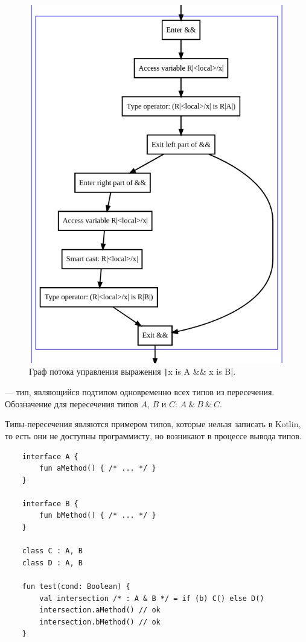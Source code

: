 \begin{figure}
    \centering
    \includegraphics[width=0.8\linewidth]{fig/cfgExample}
    \caption{Граф потока управления выражения \texttt|x is A && x is B|.}
    \label{fig:cfg-example}
\end{figure}

\begin{definition}
    \label{def:intersection-types}
     --- тип, являющийся подтипом одновременно всех типов из пересечения.
    Обозначение для пересечения типов $A$, $B$ и $C$: $A~\&~B~\&~C$.
\end{definition}

Типы-пересечения являются примером типов, которые нельзя записать в Kotlin, то есть они не доступны программисту, но возникают в процессе вывода типов.
\begin{verbatim}
    interface A {
        fun aMethod() { /* ... */ }
    }

    interface B {
        fun bMethod() { /* ... */ }
    }

    class C : A, B
    class D : A, B

    fun test(cond: Boolean) {
        val intersection /* : A & B */ = if (b) C() else D()
        intersection.aMethod() // ok
        intersection.bMethod() // ok
    }
\end{verbatim}

